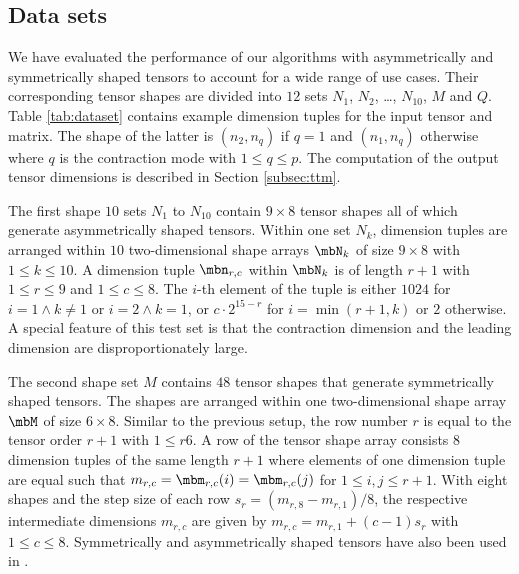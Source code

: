  
\subsection{Data sets} 
We have evaluated the performance of our algorithms with asymmetrically and symmetrically shaped tensors to account for a wide range of use cases.
Their corresponding tensor shapes are divided into $12$ sets $N_1$, $N_2$, \dots, $N_{10}$, $M$ and $Q$.
Table \ref{tab:dataset} contains example dimension tuples for the input tensor and matrix.
The shape of the latter is $(n_2,n_q)$ if $q=1$ and $(n_1,n_q)$ otherwise where $q$ is the contraction mode with $1 \leq q \leq p$.
The computation of the output tensor dimensions is described in Section \ref{subsec:ttm}.

The first shape $10$ sets $N_1$ to $N_{10}$ contain $9 \times 8$ tensor shapes all of which generate asymmetrically shaped tensors.
Within one set $N_k$, dimension tuples are arranged within $10$ two-dimensional shape arrays $\mbN_k$ of size $9 \times 8$ with $1 \leq k \leq 10$.
A dimension tuple $\mbn_{r,c}$ within $\mbN_k$ is of length $r+1$ with $1 \leq r \leq 9$ and $1 \leq c \leq 8$.
The $i$-th element of the tuple is either $1024$ for $i = 1 \wedge k \neq 1$ or $i = 2 \wedge k = 1$, or $c \cdot 2^{15-r}$ for $i = \min(r+1,k)$ or $2$ otherwise.
A special feature of this test set is that the contraction dimension and the leading dimension are disproportionately large.

The second shape set $M$ contains $48$ tensor shapes that generate symmetrically shaped tensors.
The shapes are arranged within one two-dimensional shape array $\mbM$ of size $6 \times 8$.
Similar to the previous setup, the row number $r$ is equal to the tensor order $r+1$ with $1 \leq r 6$.
A row of the tensor shape array consists $8$ dimension tuples of the same length $r+1$ where elements of one dimension tuple are equal such that $m_{r,c} = \mbm_{r,c}(i) = \mbm_{r,c}(j)$ for $1 \leq i,j \leq r+1$.
With eight shapes and the step size of each row $s_r = (m_{r,8}-m_{r,1})/8$, the respective intermediate dimensions $m_{r,c}$ are given by $m_{r,c} = m_{r,1} + (c-1) s_r$ with $1 \leq c \leq 8$.
Symmetrically and asymmetrically shaped tensors have also been used in \cite{bassoy:2019:ttv, bassoy:2018:fast}.

